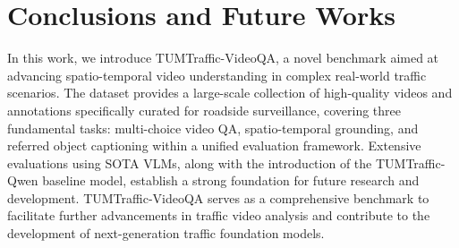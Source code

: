 
\section{Conclusions and Future Works}

In this work, we introduce TUMTraffic-VideoQA, a novel benchmark aimed at advancing spatio-temporal video understanding in complex real-world traffic scenarios. The dataset provides a large-scale collection of high-quality videos and annotations specifically curated for roadside surveillance, covering three fundamental tasks: multi-choice video QA, spatio-temporal grounding, and referred object captioning within a unified evaluation framework. Extensive evaluations using SOTA VLMs, along with the introduction of the TUMTraffic-Qwen baseline model, establish a strong foundation for future research and development.  TUMTraffic-VideoQA serves as a comprehensive benchmark to facilitate further advancements in traffic video analysis and contribute to the development of next-generation traffic foundation models.

